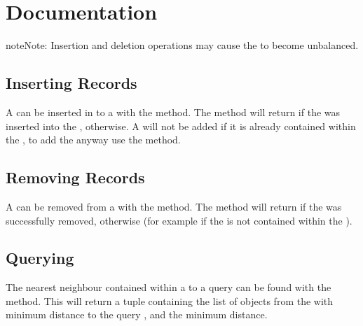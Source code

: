 \documentclass[letterpaper,10pt,english]{sphinxmanual}
\begin{document}
\section{Documentation}
\label{\detokenize{kdtree:documentation}}
\begin{sphinxadmonition}{note}{Note:}
\sphinxAtStartPar
Insertion and deletion operations may cause the  to become un\sphinxhyphen{}balanced.
\end{sphinxadmonition}


\subsection{Inserting Records}
\label{\detokenize{kdtree:inserting-records}}
\sphinxAtStartPar
A  can be inserted in to a  with the  method. The method will return  if
the  was inserted into the ,  otherwise. A  will not be added if it is already
contained within the , to add the  anyway use the  method.


\subsection{Removing Records}
\label{\detokenize{kdtree:removing-records}}
\sphinxAtStartPar
A  can be removed from a  with the  method. The method will return  if the
 was successfully removed,  otherwise (for example if the  is not contained within the
).


\subsection{Querying}
\label{\detokenize{kdtree:querying}}
\sphinxAtStartPar
The nearest neighbour  contained within a  to a query  can be found with the
 method. This will return a tuple containing the list of  objects from the  with
minimum distance to the query , and the minimum distance.
\end{document}
